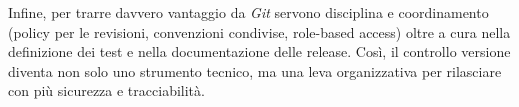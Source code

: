 Infine, per trarre davvero vantaggio da \emph{Git} servono disciplina e coordinamento (policy per le revisioni, convenzioni condivise, role-based access) oltre a cura nella definizione dei test e nella documentazione delle release. Così, il controllo versione diventa non solo uno strumento tecnico, ma una leva organizzativa per rilasciare con più sicurezza e tracciabilità.








